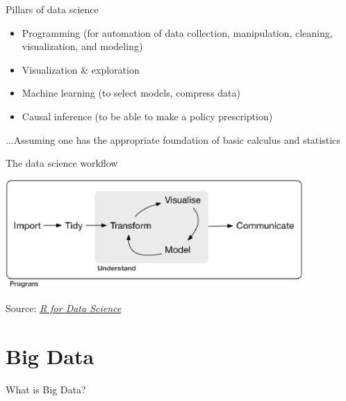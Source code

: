 \documentclass[english,aspectratio=169,12pt,xcolor=dvipsnames]{beamer}
\begin{document}
\begin{frame}{Pillars of data science}
\begin{itemize}
\item Programming (for automation of data collection, manipulation, cleaning, visualization, and modeling)
\item Visualization \& exploration
\item Machine learning (to select models, compress data)
\item Causal inference (to be able to make a policy prescription)
\end{itemize}
...Assuming one has the appropriate foundation of basic calculus and statistics
\end{frame}


\begin{frame}{The data science workflow}
\begin{center}
\includegraphics[width=0.85\textwidth]{../Graphics/data-science.eps}
\end{center}
{\scriptsize Source: \href{{http://r4ds.had.co.nz/introduction.html}}{\emph{R for Data Science}}}
\end{frame}

\section{Big Data}
\begin{frame}{What is Big Data?}
\end{frame}
\end{document}
